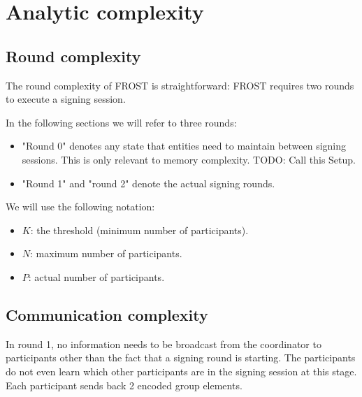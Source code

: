 
\section{Analytic complexity}\label{section:complexity}


\subsection{Round complexity}

The round complexity of FROST is straightforward: FROST requires two rounds to
execute a signing session.

In the following sections we will refer to three rounds:
\begin{itemize}
	\item "Round 0" denotes any state that entities need to maintain between signing
  sessions. This is only relevant to memory complexity. TODO: Call this Setup.
  \item "Round 1" and "round 2" denote the actual signing rounds.
\end{itemize}

We will use the following notation:
\begin{itemize}
	\item $K$: the threshold (minimum number of participants).
	\item $N$: maximum number of participants.
	\item $P$: actual number of participants.
\end{itemize}

\subsection{Communication complexity}

In round 1, no information needs to be broadcast from the coordinator to
participants other than the fact that a signing round is starting. The
participants do not even learn which other participants are in the signing
session at this stage. Each participant sends back 2 encoded group elements.

